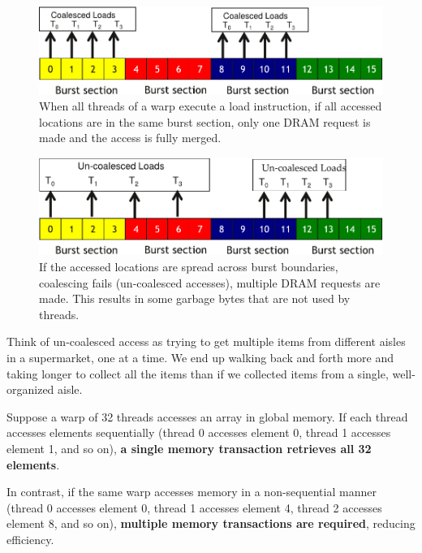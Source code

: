 \begin{figure}[!htp]
    \centering
    \includegraphics[width=.8\textwidth]{img/cuda-memory-coalescing-1.pdf}
    \caption{When all threads of a warp execute a load instruction, if all accessed locations are in the same burst section, only one DRAM request is made and the access is fully merged.}
\end{figure}

\begin{figure}[!htp]
    \centering
    \includegraphics[width=.8\textwidth]{img/cuda-memory-un-coalesced-1.pdf}
    \caption{If the accessed locations are spread across burst boundaries, coalescing fails (un-coalesced accesses), multiple DRAM requests are made. This results in some garbage bytes that are not used by threads.}
\end{figure}

\begin{examplebox}
    Think of un-coalesced access as trying to get multiple items from different aisles in a supermarket, one at a time. We end up walking back and forth more and taking longer to collect all the items than if we collected items from a single, well-organized aisle.
\end{examplebox}

\newpage

\begin{examplebox}
    Suppose a warp of 32 threads accesses an array in global memory. If each thread accesses elements sequentially (thread 0 accesses element 0, thread 1 accesses element 1, and so on), \textbf{a single memory transaction retrieves all 32 elements}.

    In contrast, if the same warp accesses memory in a non-sequential manner (thread 0 accesses element 0, thread 1 accesses element 4, thread 2 accesses element 8, and so on), \textbf{multiple memory transactions are required}, reducing efficiency.
\end{examplebox}
